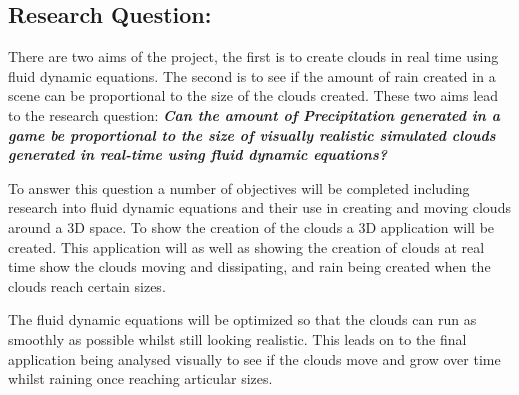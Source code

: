 \subsection{Research Question:}
There are two aims of the project, the first is to create clouds in real time using fluid dynamic equations.
The second is to see if the amount of rain created in a scene can be proportional to the size of the clouds created.
These two aims lead to the research question:
\clearpage
\textit{\textbf{Can the amount of Precipitation generated in a game be proportional to the size of visually realistic simulated clouds generated in real-time using fluid dynamic equations?
}}

To answer this question a number of objectives will be completed including research into fluid dynamic equations and their use in creating and moving clouds around a 3D space.
To show the creation of the clouds a 3D application will be created.
This application will as well as showing the creation of clouds at real time show the clouds moving and dissipating, and rain being created when the clouds reach certain sizes.

The fluid dynamic equations will be optimized so that the clouds can run as smoothly as possible whilst still looking realistic.
This leads on to the final application being analysed visually to see if the clouds move and grow over time whilst raining once reaching articular sizes.